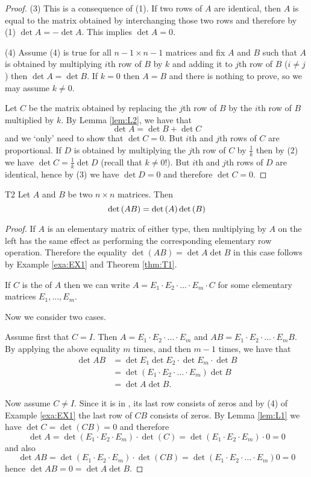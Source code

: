 \begin{proof}
(3) This is a consequence of (1). If two rows of $A$ are identical, then 
$A$ is equal to the matrix obtained by interchanging those two rows and 
therefore by (1) $\det A=-\det A$. This implies $\det A=0$. 

(4) Assume (4) is true for all $n-1\times n-1$ matrices
and fix $A$ and $B$ such that
 $A$ is obtained by multiplying $i$th row of $B$ by $k$ and adding it to 
$j$th row of $B$ ($i\neq j$) then $\det A=\det B$. 
If $k=0$ then $A=B$ and there is nothing to prove, so we may assume $k\neq 0$. 

Let $C$ be the matrix obtained by replacing the $j$th row of $B$ by the $i$th row of $B$ 
multiplied by $k$. 
By Lemma \ref{lem:L2}, we have that 
\[
\det A=\det B+\det C
\]
and we `only' need to show that $\det C=0$. But $i$th and $j$th rows of $C$
are proportional. If $D$ is obtained by multiplying the $j$th row of $C$ by $\frac 1k$
then  by (2) we have $\det C=\frac 1k\det D$ (recall that $k\neq 0$!). 
But $i$th and $j$th rows of $D$ are identical, hence by (3) we have $\det D=0$
and therefore $\det C=0$. 
\end{proof} 

\begin{theorem}{}{T2}
Let $A$ and $B$ be two $n\times n$ matrices. Then
\begin{equation*}
\det \left(AB\right) =\det \left(A\right) \det \left(B\right)
\end{equation*}
\end{theorem}

\begin{proof} If $A$ is an elementary matrix of either type, then multiplying
by $A$ on the left has the same effect as performing the corresponding elementary 
row operation. Therefore the equality $\det (AB) =\det A\det B$  in this case follows by Example \ref{exa:EX1} 
and Theorem \ref{thm:T1}. 

If $C$ is the {\rref} of $A$ then we can write $A=E_1\cdot E_2\cdot\dots\cdot E_m\cdot C$
for some elementary matrices $E_1,\dots, E_m$. 

Now we consider two cases. 

Assume first that  $C=I$. Then $A=E_1\cdot E_2\cdot \dots\cdot E_m$ 
and $AB= E_1\cdot E_2\cdot \dots\cdot E_m B$. 
    By applying the above equality $m$ times, and then $m-1$ times,   
we have that 
\begin{align*}
\det AB&=\det E_1\det E_2\cdot \det E_m\cdot \det B\\
&=\det (E_1\cdot E_2\cdot\dots\cdot E_m) \det B\\
&=\det A\det B. 
\end{align*} 

Now assume $C\neq I$. Since it is in {\rref}, its last row consists of zeros 
and by (4) of Example \ref{exa:EX1} the last row of $CB$ consists of zeros. 
By Lemma \ref{lem:L1} we have $\det C=\det (CB)=0$ and therefore 
\[
\det A=\det (E_1\cdot E_2\cdot  E_m)\cdot  \det (C)
=
\det (E_1\cdot E_2\cdot  E_m)\cdot 0=0
\]
and also 
\[
\det AB=\det (E_1\cdot E_2\cdot  E_m)\cdot  \det (C B)
=\det (E_1\cdot E_2\cdot\dots\cdot E_m) 0
=0
\]
hence $\det AB=0=\det A \det B$. 
\end{proof} 


